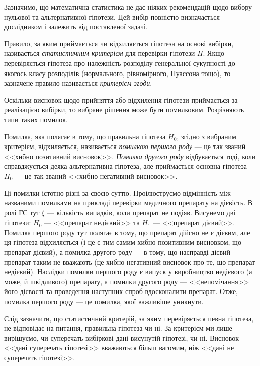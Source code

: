 Зазначимо, що математична статистика не дає ніяких рекомендацій
щодо вибору нульової та альтернативної гіпотези, Цей вибір повністю 
визначається дослідником і залежить від поставленої задачі.
\begin{definition}
    Правило, за яким приймається чи відхиляється гіпотеза на 
    основі вибірки, називається \emph{статистичним критерієм} для перевірки 
    гіпотези $H$. Якщо перевіряється гіпотеза про належність розподілу 
    генеральної сукупності до якогось класу розподілів (нормального, 
    рівномірного, Пуассона тощо), то зазначене правило називається \emph{критерієм згоди}.
\end{definition}
Оскільки висновок щодо прийняття або відхилення гіпотези 
приймається за реалізацією вибірки, то вибране рішення може бути 
помилковим. Розрізняють типи таких помилок.

\begin{definition}
    Помилка, яка полягає в тому, що правильна гіпотеза $H_0$, 
    згідно з вибраним критерієм, відхиляється, називається \emph{помилкою першого роду} --- це так званий <<хибно позитивний висновок>>. 
    \emph{Помилка другого роду} відбувається тоді, коли справджується 
    деяка альтернативна гіпотеза, але приймається основна гіпотеза $H_0$ --- це так званий <<хибно негативний висновок>>.
\end{definition}
Ці помилки істотно різні за своєю суттю. Проілюструємо відмінність 
між названими помилками на прикладі перевірки медичного препарату на дієвість.
В ролі ГС тут $\xi$ --- кількість випадків, коли препарат не подіяв. Висунемо дві гіпотези:
$H_0$ --- <<препарат недієвий>> та $H_1$ --- <<препарат дієвий>>. Помилка першого роду тут полягає в тому, що препарат дійсно не є дієвим,
але ця гіпотеза відхиляється (і це є тим самим хибно позитивним висновком, що препарат дієвий), 
а помилка другого роду --- в тому, що насправді дієвий препарат таким не вважають (це хибно негативний висновок про те, що препарат недієвий).
Наслідки помилки першого роду є випуск у виробництво недієвого (а може, й шкідливого) препарату, а помилки другого роду --- <<непомічання>> 
його дієвості та проведення наступних спроб вдосконалити препарат. Отже, помилка першого роду –-- це помилка, якої важливіше 
уникнути.

Слід зазначити, що статистичний критерій, за яким перевіряється певна 
гіпотеза, не відповідає на питання, правильна гіпотеза чи ні. За критерієм ми 
лише вирішуємо, чи суперечать вибіркові дані висунутій гіпотезі, чи ні. Висновок <<дані 
суперечать гіпотезі>> вважаються більш вагомим, ніж <<дані не суперечать гіпотезі>>.

